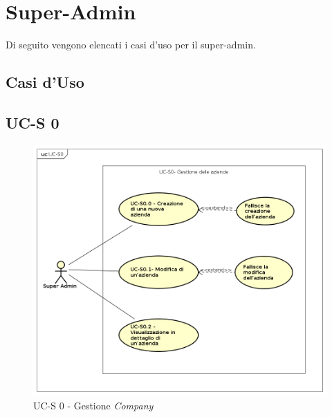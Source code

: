 \section{Super-Admin}

Di seguito vengono elencati i casi d'uso per il super-admin.

\newpage

\subsection{Casi d'Uso}

\subsection{UC-S 0}

    \begin{figure}[h]
      \begin{center}
        \includegraphics[width=12cm]{res/img/UCSuperadmin/UCS0.png}
      \caption{UC-S 0 - Gestione \textit{Company}}
      \end{center} 
    \end{figure}    
    
